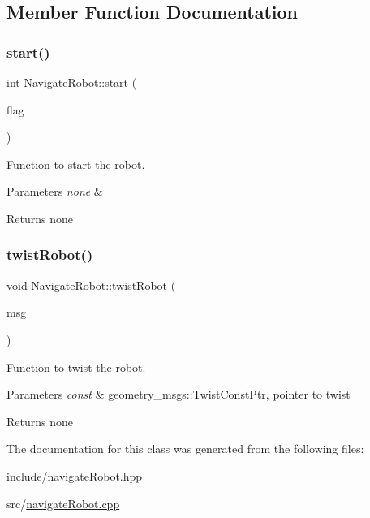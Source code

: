 \subsection{Member Function Documentation}
\mbox{\label{class_navigate_robot_ad02fc9f2481f002b7ad3b654a8ec80d2}} 
\subsubsection{\texorpdfstring{start()}{start()}}
{\footnotesize\ttfamily int Navigate\+Robot\+::start (\begin{DoxyParamCaption}\item[{bool}]{flag }\end{DoxyParamCaption})}



Function to start the robot. 


\begin{DoxyParams}{Parameters}
{\em none} & \\
\hline
\end{DoxyParams}
\begin{DoxyReturn}{Returns}
none 
\end{DoxyReturn}
\mbox{\label{class_navigate_robot_a1382b2a30d0dccfbe2e63132f3cbd880}} 
\subsubsection{\texorpdfstring{twist\+Robot()}{twistRobot()}}
{\footnotesize\ttfamily void Navigate\+Robot\+::twist\+Robot (\begin{DoxyParamCaption}\item[{const geometry\+\_\+msgs\+::\+Twist\+Const\+Ptr \&}]{msg }\end{DoxyParamCaption})}



Function to twist the robot. 


\begin{DoxyParams}{Parameters}
{\em const} & geometry\+\_\+msgs\+::\+Twist\+Const\+Ptr, pointer to twist \\
\hline
\end{DoxyParams}
\begin{DoxyReturn}{Returns}
none 
\end{DoxyReturn}


The documentation for this class was generated from the following files\+:\begin{DoxyCompactItemize}
\item 
include/navigate\+Robot.\+hpp\item 
src/\hyperlink{navigate_robot_8cpp}{navigate\+Robot.\+cpp}\end{DoxyCompactItemize}
